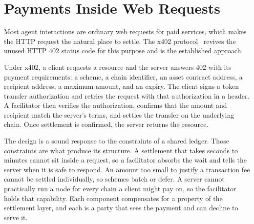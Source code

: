 \section{Payments Inside Web Requests}

Most agent interactions are ordinary web requests for paid services, which makes the HTTP request the natural place to settle. The x402 protocol~\cite{x402} revives the unused HTTP 402 status code for this purpose and is the established approach.

Under x402, a client requests a resource and the server answers 402 with its payment requirements: a scheme, a chain identifier, an asset contract address, a recipient address, a maximum amount, and an expiry. The client signs a token transfer authorization and retries the request with that authorization in a header. A facilitator then verifies the authorization, confirms that the amount and recipient match the server's terms, and settles the transfer on the underlying chain. Once settlement is confirmed, the server returns the resource.

The design is a sound response to the constraints of a shared ledger. Those constraints are what produce its structure. A settlement that takes seconds to minutes cannot sit inside a request, so a facilitator absorbs the wait and tells the server when it is safe to respond. An amount too small to justify a transaction fee cannot be settled individually, so schemes batch or defer. A server cannot practically run a node for every chain a client might pay on, so the facilitator holds that capability. Each component compensates for a property of the settlement layer, and each is a party that sees the payment and can decline to serve it.

